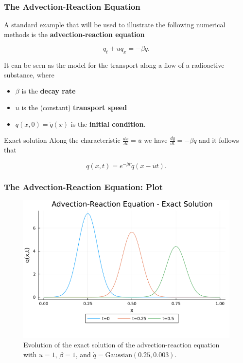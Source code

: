 \documentclass{beamer}
\newcommand{\emp}[1]{\textcolor{tum}{\textbf{#1}}}
\begin{document}
\begin{frame}
	\frametitle{The Advection-Reaction Equation}

	A standard example that will be used to illustrate the following numerical methods is the \emp{advection-reaction equation}

	\begin{equation}\label{eq:advec}
		q_t + \bar{u}q_x=-\beta q.
	\end{equation}

	It can be seen as the model for the transport along a flow of a radioactive substance, where

	\begin{itemize}
		\item $\beta$ is the \emp{decay rate}
		\item $\bar{u}$ is the (constant) \emp{transport speed}
		\item $q(x,0)= \mathring{q}(x)$ is the \emp{initial condition}.
	\end{itemize}
	\pause
	\begin{block}{Exact solution}
		Along the characteristic $\frac{dx}{dt}=\bar{u}$ we have $\frac{dq}{dt}=-\beta q$ and it follows that

		\begin{equation}\label{eq:advec_sol}
			q(x,t) = e^{-\beta t}\mathring{q}(x-\bar{u}t).
		\end{equation}
	\end{block}

\end{frame}

\begin{frame}
	\frametitle{The Advection-Reaction Equation: Plot}
	\begin{figure}[!ht]
		\centering
		\includegraphics[width=.7\textwidth]{../Advection.png}

		\caption{Evolution of the exact solution of the advection-reaction equation with $\bar{u}=1$, $\beta=1$, and $\mathring{q}=\text{Gaussian}(0.25,0.003)$.}
		\label{fig:exact}
	\end{figure}
\end{frame}
\end{document}
